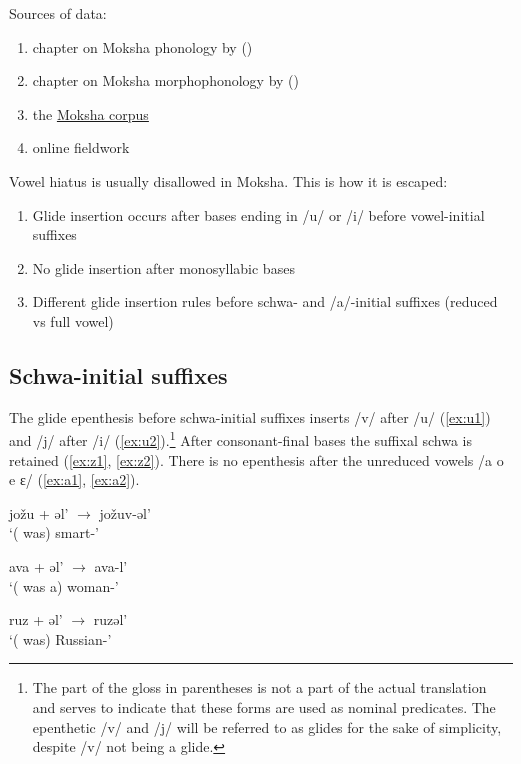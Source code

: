 \documentclass[a4paper, 12pt]{article}
\newcommand{\citeay}[2][]{\citeauthor{#2} (\citeyear[#1]{#2})}
\begin{document}
	Sources of data: 
	
	\begin{enumerate}[$\gg$]
	\setlength\itemsep{0em}
		\item chapter on Moksha phonology by \citeay{kukhto2018}
		\item chapter on Moksha morphophonology by \citeay{kozlov2018}
		\item the \href{http://moksha.web-corpora.net}{Moksha corpus}
		\item online fieldwork
	\end{enumerate}
	Vowel hiatus is usually disallowed in Moksha. This is how it is escaped:
			
	\begin{enumerate}[$\gg$]
	\setlength\itemsep{0em}
		\item Glide insertion occurs after bases ending in /u/ or /i/ before vowel-initial suffixes \parencite{kozlov2018}
		\item No glide insertion after monosyllabic bases
		\item Different glide insertion rules before schwa- and /a/-initial suffixes (reduced vs full vowel)
	\end{enumerate}
				
			\subsection{Schwa-initial suffixes}
			
	 The glide epenthesis before schwa-initial suffixes inserts /v/ after /u/ (\ref{ex:u1}) and /j/ after /i/ (\ref{ex:u2}).\footnote{The part of the gloss in parentheses is not a part of the actual translation and serves to indicate that these forms are used as nominal predicates. The epenthetic /v/ and /j/ will be referred to as glides for the sake of simplicity, despite /v/ not being a glide.} After consonant-final bases the suffixal schwa is retained (\ref{ex:z1}, \ref{ex:z2}). There is no epenthesis after the unreduced vowels /a o e ɛ/ (\ref{ex:a1}, \ref{ex:a2}).
	
\begin{minipage}[t]{.3\linewidth}
\ex\label{ex:u1}
	jožu + əl' $\rightarrow$ jožuv-əl' \\`({\Tsg} was) smart-{\Ipf}'
\xe
\end{minipage}
\hfill
\begin{minipage}[t]{.315\linewidth}
\ex\label{ex:a1}
	ava + əl' $\rightarrow$ ava-l' \\`({\Tsg} was a) woman-{\Ipf}'
\xe
\end{minipage}	
\hfill
\begin{minipage}[t]{.33\linewidth}
\ex\label{ex:z1}
	ruz + əl' $\rightarrow$ ruzəl' \\`({\Tsg} was) Russian-{\Ipf}'
\xe
\end{minipage}
\end{document}

